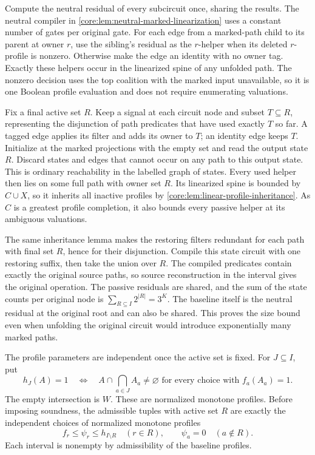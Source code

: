 Compute the neutral residual of every subcircuit
once, sharing the results. The neutral compiler
in \cref{core:lem:neutral-marked-linearization}
uses a constant number of gates per original gate.
For each edge from a marked-path child to its
parent at owner $r$, use the sibling's residual
as the $r$-helper when its deleted $r$-profile
is nonzero. Otherwise make the edge an identity
with no owner tag. Exactly these helpers occur
in the linearized spine of any unfolded path.
The nonzero decision uses the top coalition
with the marked input unavailable, so it is one
Boolean profile evaluation and does not require
enumerating valuations.

Fix a final active set $R$. Keep a signal at
each circuit node and subset $T\subseteq R$,
representing the disjunction of path predicates
that have used exactly $T$ so far. A tagged
edge applies its filter and adds its owner to
$T$; an identity edge keeps $T$. Initialize at
the marked projections with the empty set and
read the output state $R$. Discard states and
edges that cannot occur on any path to this
output state. This is ordinary reachability
in the labelled graph of states. Every used
helper then lies on some full path with owner
set $R$. Its linearized spine is bounded by
$C\cup X$, so it inherits all inactive
profiles by
\cref{core:lem:linear-profile-inheritance}.
As $C$ is a greatest profile completion, it
also bounds every passive helper at its
ambiguous valuations.

The same inheritance lemma makes the restoring
filters redundant for each path with final set
$R$, hence for their disjunction. Compile this
state circuit with one restoring suffix, then
take the union over $R$. The compiled predicates
contain exactly the original source paths, so
source reconstruction in the interval gives the
original operation. The passive residuals are
shared, and the sum of the state counts per
original node is $\sum_{R\subseteq I}2^{|R|}
=3^K$. The baseline itself is the neutral
residual at the original root and can also be
shared. This proves the size bound even when
unfolding the original circuit would introduce
exponentially many marked paths.

The profile parameters are independent once the active set is fixed.
For $J\subseteq I$, put
\[
 h_J(A)=1\quad\Longleftrightarrow\quad
 A\cap\bigcap_{a\in J}A_a\ne\varnothing
 \text{ for every choice with }f_a(A_a)=1.
\]
The empty intersection is $W$. These are normalized monotone profiles.
Before imposing soundness, the admissible tuples with active set $R$
are exactly the independent choices of normalized monotone profiles
\[
 f_r\leq\psi_r\leq h_{I\setminus R}\quad(r\in R),
 \qquad \psi_a=0\quad(a\notin R).
\]
Each interval is nonempty by admissibility of the baseline profiles.

